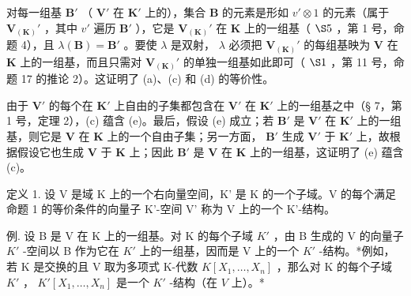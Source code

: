 对每一组基 \(\mathbf{B}'\) （ \(\mathbf{V}'\) 在 \(\mathbf{K}'\) 上的），集合 \(\mathbf{B}\) 的元素是形如 \(v' \otimes 1\) 的元素（属于 \(\mathbf{V}_{(\mathbf{K})}'\) ，其中 \(v'\) 遍历 \(\mathbf{B}'\) ），它是 \(\mathbf{V}_{(\mathbf{K})}'\) 在 \(\mathbf{K}\) 上的一组基（ \(\S 5\) ，第 1 号，命题 4），且 \(\lambda(\mathbf{B}) = \mathbf{B}'\) 。要使 \(\lambda\) 是双射， \(\lambda\) 必须把 \(\mathbf{V}_{(\mathbf{K})}'\) 的每组基映为 \(\mathbf{V}\) 在 \(\mathbf{K}\) 上的一组基，而且只需对 \(\mathbf{V}_{(\mathbf{K})}'\) 的单独一组基如此即可（ \(\S 1\) ，第 11 号，命题 17 的推论 2）。这证明了 (a)、(c) 和 (d) 的等价性。

由于 \(\mathbf{V}'\) 的每个在 \(\mathbf{K}'\) 上自由的子集都包含在 \(\mathbf{V}'\) 在 \(\mathbf{K}'\) 上的一组基之中（§ 7，第 1 号，定理 2），(c) 蕴含 (e)。最后，假设 (e) 成立；若 \(\mathbf{B}'\) 是 \(\mathbf{V}'\) 在 \(\mathbf{K}'\) 上的一组基，则它是 \(\mathbf{V}\) 在 \(\mathbf{K}\) 上的一个自由子集；另一方面， \(\mathbf{B}'\) 生成 \(\mathbf{V}'\) 于 \(\mathbf{K}'\) 上，故根据假设它也生成 \(\mathbf{V}\) 于 \(\mathbf{K}\) 上；因此 \(\mathbf{B}'\) 是 \(\mathbf{V}\) 在 \(\mathbf{K}\) 上的一组基，这证明了 (e) 蕴含 (c)。

定义 1. 设 V 是域 K 上的一个右向量空间，K' 是 K 的一个子域。V 的每个满足命题 1 的等价条件的向量子 K'-空间 V' 称为 V 上的一个 K'-结构。

例. 设 B 是 V 在 K 上的一组基。对 K 的每个子域 \(K'\) ，由 B 生成的 V 的向量子 \(K'\) -空间以 B 作为它在 \(K'\) 上的一组基，因而是 V 上的一个 \(K'\) -结构。*例如，若 K 是交换的且 V 取为多项式 K-代数 \(K[X_{1},\ldots,X_{n}]\) ，那么对 K 的每个子域 \(K'\) ， \(K'[X_{1},\ldots,X_{n}]\) 是一个 \(K'\) -结构（在 \(V\) 上）。*

